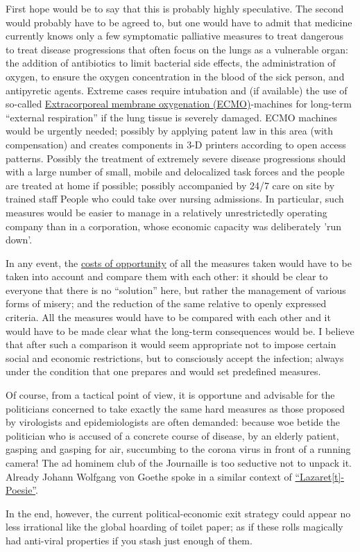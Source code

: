 \documentclass[%
 reprint,
 showpacs,
 showkeys,
 preprintnumbers,
 amsmath,amssymb,
 aps,
  pra,
  longbibliography,
 floatfix,
 ]{revtex4-1}
\begin{document}
First hope would be to say that this is probably highly speculative.
The second would probably have to be agreed to, but one would have to admit
that medicine currently knows only a few symptomatic palliative measures to treat dangerous
to treat disease progressions that often focus on the lungs as a vulnerable organ:
the addition of antibiotics to limit bacterial side effects, the administration of oxygen,
to ensure the oxygen concentration in the blood of the sick person,
and antipyretic agents.
Extreme cases require intubation and (if available) the use of so-called
\href{https://uihc.org/health-topics/family-guide-ecmo}{Extracorporeal membrane oxygenation (ECMO)}-machines for long-term
``external respiration'' if the lung tissue is severely damaged.
ECMO machines would be urgently needed; possibly by applying patent law in this area (with compensation)
and creates components in 3-D printers according to open access patterns.
Possibly the treatment of extremely severe disease progressions should
with a large number of small, mobile and delocalized task forces
and the people are treated at home if possible; possibly accompanied by 24/7 care on site by trained staff
People who could take over nursing admissions.
In particular, such measures would be easier to manage in a relatively unrestrictedly operating company than in a corporation,
whose economic capacity was deliberately 'run down'.



In any event, the \href{https://lex.substack.com/p/slowing-gdp-growth-by-15-is-like}{costs of opportunity} of all the measures taken would have to be taken into account
and compare them with each other:
it should be clear to everyone that there is no ``solution'' here, but rather the management of various forms of misery;
and the reduction of the same relative to openly expressed criteria.
All the measures would have to be compared with each other and it would have to be made clear what the long-term consequences would be.
I believe that after such a comparison it would seem appropriate not to impose certain social and economic restrictions,
but to consciously accept the infection; always under the condition that one prepares and
would set predefined measures.

Of course, from a tactical point of view, it is opportune and advisable for the politicians concerned to take exactly the same hard measures as those proposed by virologists and epidemiologists
are often demanded: because woe betide the politician who is accused of a concrete course of disease,
by an elderly patient, gasping and gasping for air, succumbing to the corona virus in front of a running camera!
The ad hominem club of the Journaille is too seductive not to unpack it.
Already Johann Wolfgang von Goethe spoke in a similar context of \href{http://woerterbuchnetz.de/GWB/call_wbgui_py_from_form?sigle=GWB&mode=Volltextsuche&hitlist=&patternlist=&lemid=JL00944}{``Lazaret[t]-Poesie''}.

In the end, however, the current political-economic exit strategy could appear no less irrational
like the global hoarding of toilet paper; as if these rolls magically had anti-viral properties
if you stash just enough of them.

%
\end{document}
